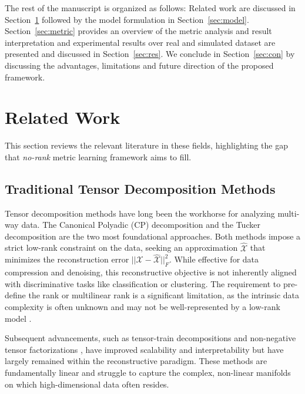 \documentclass[a4paper,12pt,reqno]{amsart}
\theoremstyle{definition}
\theoremstyle{remark}
\begin{document}
The rest of the manuscript is organized as follows: Related work are discussed in Section~\ref{sec:related_work} followed by the model formulation in Section~\ref{sec:model}.
Section~\ref{sec:metric} provides an overview of the metric analysis and result interpretation and experimental results over real and simulated dataset are presented and discussed in Section~\ref{sec:res}. We conclude in Section~\ref{sec:con} by discussing the advantages,  limitations and future direction of the proposed framework.


\section{Related Work}
\label{sec:related_work}

This section reviews the relevant literature in these fields, highlighting the gap that  \textit{no-rank} metric learning framework aims to fill.

\subsection*{Traditional Tensor Decomposition Methods}

Tensor decomposition methods have long been the workhorse for analyzing multi-way data. The Canonical Polyadic (CP) decomposition \cites{hitchcock1927expression} and the Tucker decomposition \cite{tucker1966some} are the two most foundational approaches. Both methods impose a strict low-rank constraint on the data, seeking an approximation $\hat{\mathcal{X}}$ that minimizes the reconstruction error $||\mathcal{X} - \hat{\mathcal{X}}||_F^2$. While effective for data compression and denoising, this reconstructive objective is not inherently aligned with discriminative tasks like classification or clustering. The requirement to pre-define the rank or multilinear rank is a significant limitation, as the intrinsic data complexity is often unknown and may not be well-represented by a low-rank model \cite{acar2011scalable}.

Subsequent advancements, such as tensor-train decompositions \cite{oseledets2011tensor} and non-negative tensor factorizations \cite{cichocki2009nonnegative}, have improved scalability and interpretability but have largely remained within the reconstructive paradigm. These methods are fundamentally linear and struggle to capture the complex, non-linear manifolds on which high-dimensional data often resides. 

	
	
\end{document}
